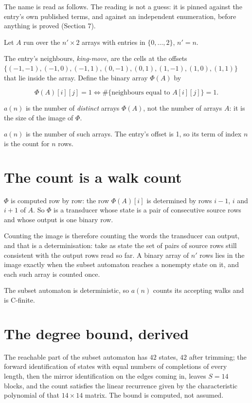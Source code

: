 \documentclass[11pt]{article}
\theoremstyle{definition}
\begin{document}
The name is read as follows. The reading is not a guess: it is pinned against the entry's own published terms, and against an independent enumeration, before anything is proved (Section 7).

Let $A$ run over the $n' \times 2$ arrays with entries in $\{0,\dots,2\}$, $n' = n$.

The entry's neighbours, {\itshape king-move}, are the cells at the offsets $\{(-1,-1), (-1,0), (-1,1), (0,-1), (0,1), (1,-1), (1,0), (1,1)\}$ that lie inside the array. Define the binary array $\Phi(A)$ by

\[\Phi(A)[i][j] = 1 \iff \#\{\text{neighbours equal to } A[i][j]\} = 1.\]

$a(n)$ is the number of {\itshape distinct} arrays $\Phi(A)$, not the number of arrays $A$: it is the size of the image of $\Phi$.

$a(n)$ is the number of such arrays. The entry's offset is 1, so its term of index $n$ is the count for $n$ rows.

\section{The count is a walk count}

$\Phi$ is computed row by row: the row $\Phi(A)[i]$ is determined by rows $i-1$, $i$ and $i+1$ of $A$. So $\Phi$ is a transducer whose state is a pair of consecutive source rows and whose output is one binary row.

Counting the image is therefore counting the words the transducer can output, and that is a determinisation: take as state the set of pairs of source rows still consistent with the output rows read so far. A binary array of $n'$ rows lies in the image exactly when the subset automaton reaches a nonempty state on it, and each such array is counted once.

The subset automaton is deterministic, so $a(n)$ counts its accepting walks and is C-finite.

\section{The degree bound, derived}

The reachable part of the subset automaton has $42$ states, $42$ after trimming; the forward identification of states with equal numbers of completions of every length, then the mirror identification on the edges coming in, leaves $S = 14$ blocks, and the count satisfies the linear recurrence given by the characteristic polynomial of that $14\times14$ matrix. The bound is computed, not assumed.
\end{document}
